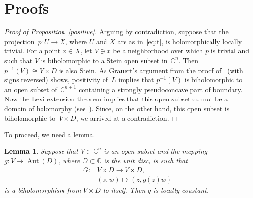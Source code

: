 \documentclass[11pt]{amsart}
\newcommand*{\C}{{\mathbb C}}
\DeclareMathOperator{\Aut}{Aut}
\newtheorem{lemma}[proposition]{Lemma}
\theoremstyle{remark}
\theoremstyle{definition}
\begin{document}
\section{Proofs}\label{sec:proofs}

\begin{proof}[Proof of Proposition~\ref{positive}]
Arguing by contradiction, suppose that the projection~$p\colon U\to
X$, where $U$ and $X$ are as in~\eqref{eq:t}, is holomorphically
locally trivial. For a point $x\in X$, let $V\ni x$ be a neighborhood
over which $p$ is trivial and such that $V$ is biholomorphic to a
Stein open subset in~$\C^n$. Then $p^{-1}(V)\cong V\times D$ is also
Stein. As Grauert's argument from the proof of~\cite[\S\,3,
  Satz~1]{Grauert62} (with signs reversed) shows, positivity of~$L$
implies that $p^{-1}(V)$ is biholomorphic to an open subset
of~$\C^{n+1}$ containing a strongly pseudoconcave part of boundary.
Now the Levi extension theorem implies that this open subset cannot be
a domain of holomorphy (see~\cite{Siu}). Since, on the other hand,
this open subset is biholomorphic to~$V\times D$, we arrived at a
contradiction.
\end{proof}

To proceed, we need a lemma.

\begin{lemma}\label{lemma}
Suppose that $V\subset\C^n$ is an open subset and the mapping $g\colon
V\to\Aut(D)$, where $D\subset\C$ is the unit disc, is such that 
\begin{equation}\label{eq:G}
\begin{aligned}
  G\colon &V\times D\to V\times D,\\
  &(z,w)\mapsto(z,g(z)w)  
\end{aligned}
\end{equation}
is a biholomorphism from $V\times D$ to
itself. Then $g$ is locally constant.
\end{lemma}
\end{document}

